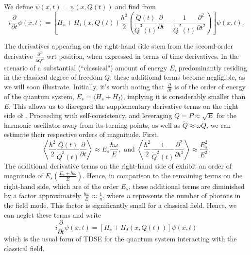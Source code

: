 We define \(\psi(x, t) = \psi(x, Q(t))\) and find from 
\begin{equation}
    \label{eq:class_jcm_eq15}
    i \frac{\partial}{\partial t}\psi(x, t) = \left[ H_s + H_I(x,Q(t)) 
    \frac{\hbar^2}{2} \left(\frac{\ddot{Q}(t)}{\dot{Q}^3(t)}\frac{\partial}{\partial t}
    - \frac{1}{\dot{Q}^2(t)} 
    \frac{\partial^2}{\partial t^2}\right)\right]\psi(x, t).
\end{equation}

The derivatives appearing on the right-hand side stem from the second-order derivative 
$\frac{\partial^2}{\partial Q^2}$ wrt position, when expressed in terms 
of time derivatives. In the scenario of a substantial (``classical") amount of 
energy $E$, predominantly residing in the classical degree of freedom $Q$, these additional 
terms become negligible, as we will soon illustrate. Initially, it's worth noting that 
$\frac{\partial}{\partial t}$ is of the order of energy of the quantum system, 
$E_s = \langle H_s + H_I\rangle$, implying it is considerably smaller than $E$. This allows us to 
disregard the supplementary derivative terms on the right side of . 
Proceeding with self-consistency, and leveraging ${\dot{Q}} = P \approx \sqrt{E}$ 
for the harmonic oscillator away from its turning points, as well as 
$\ddot{Q} \approx \omega \dot{Q}$, we can estimate their respective orders of magnitude.
First, 
\begin{equation}
    \label{eq:class_jcm_eq16}
    \left \langle \frac{\hbar^2}{2} \frac{\ddot{Q}(t)}{\dot{Q}^3(t)}\frac{\partial}{\partial t} \right\rangle
    \approx E_s \frac{\hbar \omega}{E}, \text{ and } \left \langle\frac{\hbar^2}{2} \frac{1}{\dot{Q}^2(t)} 
    \frac{\partial^2}{\partial t^2} \right\rangle \approx \frac{E_s^2}{E^2}.
\end{equation}
The additional derivative terms on the right-hand side of  
exhibit an order of magnitude of $E_s\left(\frac{E_s + \hbar \omega}{E}\right)$. 
Hence, in comparison to the remaining terms on the right-hand side, which are of 
the order $E_s$, these additional terms are diminished by a factor approximately 
$\frac{\hbar \omega}{E} \approx \frac{1}{n}$, where $n$ represents the number of
photons in the field mode.
This factor is significantly small for a classical field. Hence, we can neglet these 
terms and write
\begin{equation}
    \label{eq:class_jcm_eq17}
    i \frac{\partial}{\partial t}\psi(x, t) = \left[ H_s + H_I(x,Q(t))\right]\psi(x, t)
\end{equation}
which is the usual form of TDSE for the quantum system interacting with the classical field.

